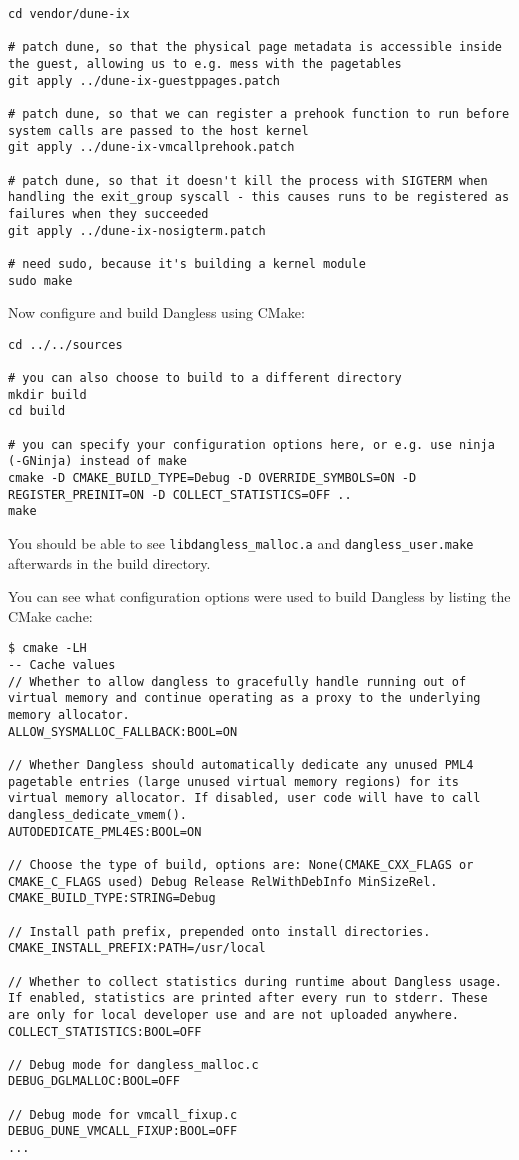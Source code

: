 \begin{verbatim}
cd vendor/dune-ix

# patch dune, so that the physical page metadata is accessible inside the guest, allowing us to e.g. mess with the pagetables
git apply ../dune-ix-guestppages.patch

# patch dune, so that we can register a prehook function to run before system calls are passed to the host kernel
git apply ../dune-ix-vmcallprehook.patch

# patch dune, so that it doesn't kill the process with SIGTERM when handling the exit_group syscall - this causes runs to be registered as failures when they succeeded
git apply ../dune-ix-nosigterm.patch

# need sudo, because it's building a kernel module
sudo make
\end{verbatim}

Now configure and build Dangless using CMake:

\begin{verbatim}
cd ../../sources

# you can also choose to build to a different directory
mkdir build
cd build

# you can specify your configuration options here, or e.g. use ninja (-GNinja) instead of make
cmake -D CMAKE_BUILD_TYPE=Debug -D OVERRIDE_SYMBOLS=ON -D REGISTER_PREINIT=ON -D COLLECT_STATISTICS=OFF ..
make
\end{verbatim}

You should be able to see \texttt{libdangless\_malloc.a} and \texttt{dangless\_user.make} afterwards in the build directory.

You can see what configuration options were used to build Dangless by listing the CMake cache:

\begin{verbatim}
$ cmake -LH
-- Cache values
// Whether to allow dangless to gracefully handle running out of virtual memory and continue operating as a proxy to the underlying memory allocator.
ALLOW_SYSMALLOC_FALLBACK:BOOL=ON

// Whether Dangless should automatically dedicate any unused PML4 pagetable entries (large unused virtual memory regions) for its virtual memory allocator. If disabled, user code will have to call dangless_dedicate_vmem().
AUTODEDICATE_PML4ES:BOOL=ON

// Choose the type of build, options are: None(CMAKE_CXX_FLAGS or CMAKE_C_FLAGS used) Debug Release RelWithDebInfo MinSizeRel.
CMAKE_BUILD_TYPE:STRING=Debug

// Install path prefix, prepended onto install directories.
CMAKE_INSTALL_PREFIX:PATH=/usr/local

// Whether to collect statistics during runtime about Dangless usage. If enabled, statistics are printed after every run to stderr. These are only for local developer use and are not uploaded anywhere.
COLLECT_STATISTICS:BOOL=OFF

// Debug mode for dangless_malloc.c
DEBUG_DGLMALLOC:BOOL=OFF

// Debug mode for vmcall_fixup.c
DEBUG_DUNE_VMCALL_FIXUP:BOOL=OFF
...
\end{verbatim}


